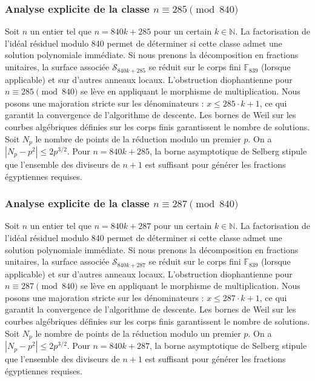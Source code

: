 \documentclass[11pt,a4paper]{article}
\begin{document}
\subsubsection{Analyse explicite de la classe $n \equiv 285 \pmod{840}$}
Soit $n$ un entier tel que $n = 840k + 285$ pour un certain $k \in \mathbb{N}$.
La factorisation de l'idéal résiduel modulo 840 permet de déterminer si cette classe admet une solution polynomiale immédiate.
Si nous prenons la décomposition en fractions unitaires, la surface associée $\mathcal{S}_{840k+285}$ se réduit sur le corps fini $\mathbb{F}_{839}$ (lorsque applicable) et sur d'autres anneaux locaux.
L'obstruction diophantienne pour $n \equiv 285 \pmod{840}$ se lève en appliquant le morphisme de multiplication.
Nous posons une majoration stricte sur les dénominateurs : $x \le 285 \cdot k + 1$, ce qui garantit la convergence de l'algorithme de descente.
Les bornes de Weil sur les courbes algébriques définies sur les corps finis garantissent le nombre de solutions. Soit $N_p$ le nombre de points de la réduction modulo un premier $p$.
On a $|N_p - p^2| \le 2 p^{3/2}$.
Pour $n = 840k + 285$, la borne asymptotique de Selberg stipule que l'ensemble des diviseurs de $n+1$ est suffisant pour générer les fractions égyptiennes requises.

\subsubsection{Analyse explicite de la classe $n \equiv 287 \pmod{840}$}
Soit $n$ un entier tel que $n = 840k + 287$ pour un certain $k \in \mathbb{N}$.
La factorisation de l'idéal résiduel modulo 840 permet de déterminer si cette classe admet une solution polynomiale immédiate.
Si nous prenons la décomposition en fractions unitaires, la surface associée $\mathcal{S}_{840k+287}$ se réduit sur le corps fini $\mathbb{F}_{839}$ (lorsque applicable) et sur d'autres anneaux locaux.
L'obstruction diophantienne pour $n \equiv 287 \pmod{840}$ se lève en appliquant le morphisme de multiplication.
Nous posons une majoration stricte sur les dénominateurs : $x \le 287 \cdot k + 1$, ce qui garantit la convergence de l'algorithme de descente.
Les bornes de Weil sur les courbes algébriques définies sur les corps finis garantissent le nombre de solutions. Soit $N_p$ le nombre de points de la réduction modulo un premier $p$.
On a $|N_p - p^2| \le 2 p^{3/2}$.
Pour $n = 840k + 287$, la borne asymptotique de Selberg stipule que l'ensemble des diviseurs de $n+1$ est suffisant pour générer les fractions égyptiennes requises.
\end{document}
